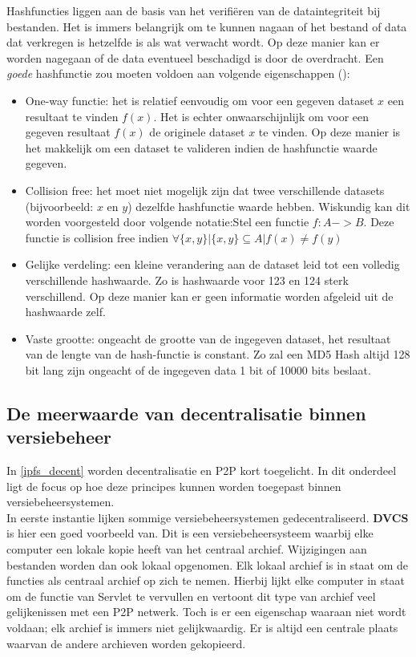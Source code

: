 Hashfuncties liggen aan de basis van het verifiëren van de dataintegriteit bij bestanden. Het is immers belangrijk om te kunnen nagaan of het bestand of data dat verkregen is hetzelfde is als wat verwacht wordt. Op deze manier kan er worden nagegaan of de data eventueel beschadigd is door de overdracht. Een \textit{goede} hashfunctie zou moeten voldoen aan volgende eigenschappen (\autocite{Anderson93}):

\begin{itemize}
\item One-way functie: het is relatief eenvoudig om voor een gegeven dataset $x$ een resultaat te vinden $f(x)$. Het is echter onwaarschijnlijk om voor een gegeven resultaat $f(x)$ de originele dataset $x$ te vinden. Op deze manier is het makkelijk om een dataset te valideren indien de hashfunctie waarde gegeven.\\
\item Collision free: het moet niet mogelijk zijn dat twee verschillende datasets (bijvoorbeeld: $x$ en $y$) dezelfde hashfunctie waarde hebben. Wiskundig kan dit worden voorgesteld door volgende notatie:Stel een functie $f:A->B$. Deze functie is collision free indien $\forall \{x,y\}|\{x,y\} \subseteq A | f(x) \neq f(y)$\\
\item Gelijke verdeling: een kleine verandering aan de dataset leid tot een volledig verschillende hashwaarde. Zo is hashwaarde voor 123 en 124 sterk verschillend. Op deze manier kan er geen informatie worden afgeleid uit de hashwaarde zelf.\\
\item Vaste grootte: ongeacht de grootte van de ingegeven dataset, het resultaat van de lengte van de hash-functie is constant. Zo zal een MD5 Hash altijd 128 bit lang zijn ongeacht of de ingegeven data 1 bit of 10000 bits beslaat.
\end{itemize}

\subsection{De meerwaarde van decentralisatie binnen versiebeheer}
In \ref{ipfs_decent} worden decentralisatie en P2P kort toegelicht. In dit onderdeel ligt de focus op hoe deze principes kunnen worden toegepast binnen versiebeheersystemen.\\

In eerste instantie lijken sommige versiebeheersystemen gedecentraliseerd. \textbf{DVCS} is hier een goed voorbeeld van. Dit is een versiebeheersysteem waarbij elke computer een lokale kopie heeft van het centraal archief. Wijzigingen aan bestanden worden dan ook lokaal opgenomen. Elk lokaal archief is in staat om de functies als centraal archief op zich te nemen. Hierbij lijkt elke computer in staat om de functie van Servlet te vervullen en vertoont dit type van archief veel gelijkenissen met een P2P netwerk. Toch is er een eigenschap waaraan niet wordt voldaan; elk archief is immers niet gelijkwaardig. Er is altijd een centrale plaats waarvan de andere archieven worden gekopieerd.\\

